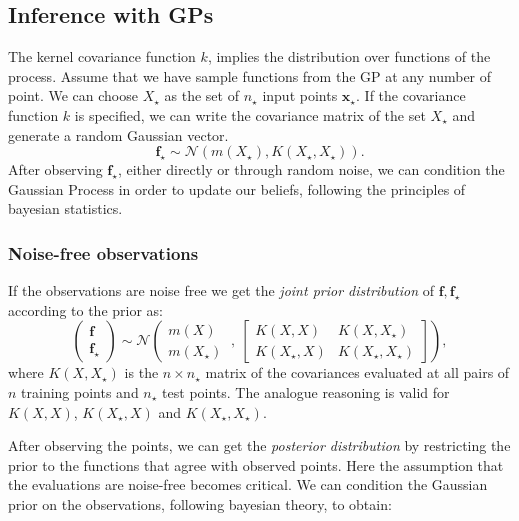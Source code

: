 \documentclass{article}
\begin{document}
	\subsection{Inference with GPs}
	The kernel covariance function $k$, implies the distribution over functions of the process. Assume that we have sample functions from the GP at any number of point. We can choose $X_\star$ as the set of $n_\star$ input points $\mathbf{x_\star}$. If the covariance function $k$ is specified, we can write the covariance matrix of the set $X_\star$ and generate a random Gaussian vector.
	\begin{equation}
		\mathbf{f_\star} \sim \mathcal{N}(m(X_\star), K(X_\star, X_\star)).
	\end{equation}
	After observing $\mathbf{f_\star}$, either directly or through random noise, we can condition the Gaussian Process in order to update our beliefs, following the principles of bayesian statistics.
	\subsubsection{Noise-free observations}
	If the observations are noise free we get the \textit{joint prior distribution} of $\mathbf{f}, \mathbf{f}_\star$ according to the prior as:
	\begin{equation} \label{eq:gp_prior}
		\begin{pmatrix}
			\mathbf{f} \\
			\mathbf{f}_\star
		\end{pmatrix} 
		\sim \mathcal{N} \left(
		\begin{matrix}
			m(X) \\
			m(X_\star)
		\end{matrix} \ , \ 
		\begin{bmatrix}
			K(X,X) & K(X,X_\star) \\
			K(X_\star,X) & K(X_\star,X_\star)
		\end{bmatrix} \right),
	\end{equation}
	where $K(X, X_\star)$ is the $n \times n_\star$ matrix of the covariances evaluated at all pairs of $n$ training points and $n_\star$ test points. The analogue reasoning is valid for $K(X,X)$, $K(X_\star,X)$ and $K(X_\star,X_\star)$.
	
	After observing the points, we can get the \textit{posterior distribution} by restricting the prior to the functions that agree with observed points. Here the assumption that the evaluations are noise-free becomes critical. We can condition the Gaussian prior on the observations, following bayesian theory, to obtain:
	
\end{document}
